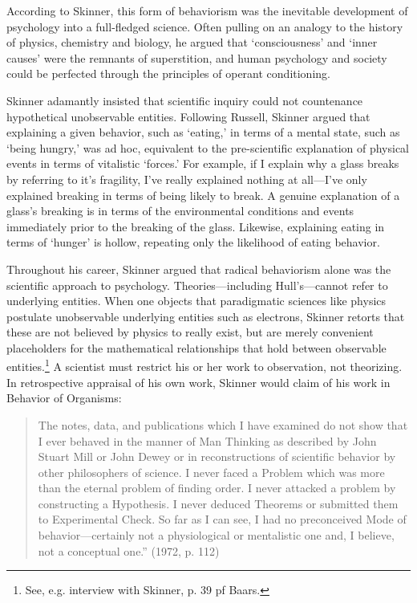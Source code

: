 According to Skinner, this form of behaviorism was the inevitable development of psychology into a full-fledged science. Often pulling on an analogy to the history of physics, chemistry and biology, he argued that `consciousness' and `inner causes' were the remnants of superstition, and human psychology and society could be perfected through the principles of operant conditioning. 

Skinner adamantly insisted that scientific inquiry could not countenance hypothetical unobservable entities. Following Russell, Skinner argued that explaining a given behavior, such as `eating,' in terms of a mental state, such as `being hungry,' was ad hoc, equivalent to the pre-scientific explanation of physical events in terms of vitalistic `forces.' For example, if I explain why a glass breaks by referring to it's fragility, I've really explained nothing at all---I’ve only explained breaking in terms of being likely to break. A genuine explanation of a glass's breaking is in terms of the environmental conditions and events immediately prior to the breaking of the glass. Likewise, explaining eating in terms of `hunger' is hollow, repeating only the likelihood of eating behavior.

Throughout his career, Skinner argued that radical behaviorism alone was the scientific approach to psychology. Theories---including Hull’s---cannot refer to underlying entities. When one objects that paradigmatic sciences like physics postulate unobservable underlying entities such as electrons, Skinner retorts that these are not believed by physics to really exist, but are merely convenient placeholders for the mathematical relationships that hold between observable entities.\footnote{See, e.g. interview with Skinner, p. 39 pf Baars.} A scientist must restrict his or her work to observation, not theorizing. In retrospective appraisal of his own work, Skinner would claim of his work in Behavior of Organisms:

\begin{quote}

The notes, data, and publications which I have examined do not show that I ever behaved in the manner of Man Thinking as described by John Stuart Mill or John Dewey or in reconstructions of scientific behavior by other philosophers of science. I never faced a Problem which was more than the eternal problem of finding order. I never attacked a problem by constructing a Hypothesis. I never deduced Theorems or submitted them to Experimental Check. So far as I can see, I had no preconceived Mode of behavior—certainly not a physiological or mentalistic one and, I believe, not a conceptual one.” (1972, p. 112)
\end{quote}

